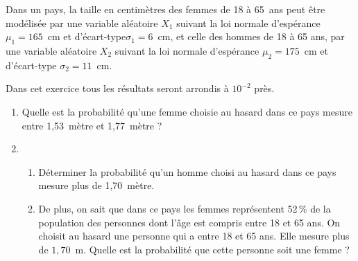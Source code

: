 \documentclass[12pt,french]{article}
\begin{document}
\begin{question}[subtitle={Polynésie 2015}]
  Dans un pays, la taille en centimètres des femmes de 18 à 65~ans peut être
  modélisée par une variable aléatoire $X_1$ suivant la loi normale
  d'espérance $\mu_1 = 165$~cm et d'écart-type$\sigma_1 = 6$~cm, et celle
  des hommes de 18 à 65 ans, par une variable aléatoire $X_2$ suivant la loi
  normale d'espérance $\mu_2 = 175$~cm et d'écart-type $\sigma_2 = 11$~cm.

  Dans cet exercice tous les résultats seront arrondis à $10^{-2}$ près.

  \medskip

  \begin{enumerate}
    \item Quelle est la probabilité qu'une femme choisie au hasard dans ce
      pays mesure entre 1,53~mètre et 1,77~mètre ?
    \item 
      \begin{enumerate}
        \item Déterminer la probabilité qu'un homme choisi au hasard dans ce
          pays mesure plus de 1,70~mètre.
        \item De plus, on sait que dans ce pays les femmes représentent
          52\,\% de la population des personnes dont l'âge est compris entre
          18 et 65 ans. On choisit au hasard une personne qui a entre 18 et
          65 ans. Elle mesure plus de $1,70$~m. Quelle est la probabilité
          que cette personne soit une femme ?
      \end{enumerate}
  \end{enumerate}

\end{question}
\end{document}
